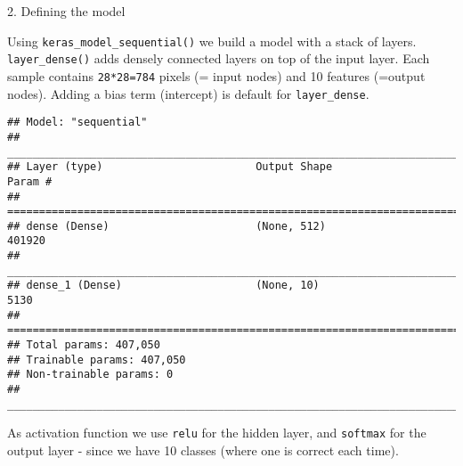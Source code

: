 \documentclass[10pt,ignorenonframetext,]{beamer}
\newenvironment{Shaded}{\begin{snugshade}}{\end{snugshade}}
\newcommand{\DataTypeTok}[1]{\textcolor[rgb]{0.13,0.29,0.53}{#1}}
\newcommand{\DecValTok}[1]{\textcolor[rgb]{0.00,0.00,0.81}{#1}}
\newcommand{\KeywordTok}[1]{\textcolor[rgb]{0.13,0.29,0.53}{\textbf{#1}}}
\newcommand{\NormalTok}[1]{#1}
\newcommand{\OperatorTok}[1]{\textcolor[rgb]{0.81,0.36,0.00}{\textbf{#1}}}
\newcommand{\StringTok}[1]{\textcolor[rgb]{0.31,0.60,0.02}{#1}}
\begin{document}
\begin{frame}[fragile]

\begin{block}{2. Defining the model}

\vspace{2mm}

Using \texttt{keras\_model\_sequential()} we build a model with a stack
of layers. \texttt{layer\_dense()} adds densely connected layers on top
of the input layer. Each sample contains \texttt{28*28=784} pixels (=
input nodes) and 10 features (=output nodes). Adding a bias term
(intercept) is default for \texttt{layer\_dense}.

\scriptsize

\begin{Shaded}
\end{Shaded}

\begin{verbatim}
## Model: "sequential"
## ________________________________________________________________________________
## Layer (type)                        Output Shape                    Param #     
## ================================================================================
## dense (Dense)                       (None, 512)                     401920      
## ________________________________________________________________________________
## dense_1 (Dense)                     (None, 10)                      5130        
## ================================================================================
## Total params: 407,050
## Trainable params: 407,050
## Non-trainable params: 0
## ________________________________________________________________________________
\end{verbatim}

\vspace{2mm}

\normalsize

As activation function we use \texttt{relu} for the hidden layer, and
\texttt{softmax} for the output layer - since we have 10 classes (where
one is correct each time).

\end{block}

\end{frame}
\end{document}
